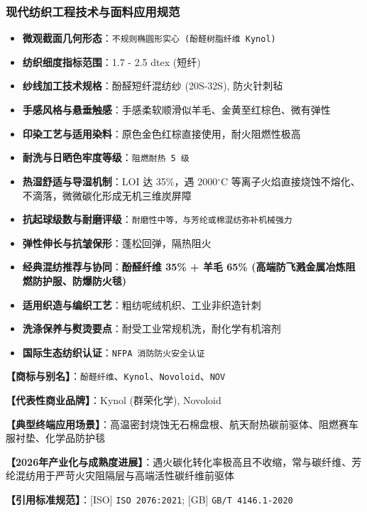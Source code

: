 \documentclass[11pt,openright,twoside,UTF8]{ctexbook}
\begin{document}
\subsubsection*{现代纺织工程技术与面料应用规范}
\begin{itemize} \setlength{\itemsep}{2pt}
    \item \textbf{微观截面几何形态}：\texttt{不规则椭圆形实心 (酚醛树脂纤维 Kynol)}
    \item \textbf{纺织细度指标范围}：1.7 - 2.5 dtex (短纤)
    \item \textbf{纱线加工技术规格}：酚醛短纤混纺纱 (20S-32S), 防火针刺毡
    \item \textbf{手感风格与悬垂触感}：手感柔软顺滑似羊毛、金黄至红棕色、微有弹性
    \item \textbf{印染工艺与适用染料}：原色金色红棕直接使用，耐火阻燃性极高
    \item \textbf{耐洗与日晒色牢度等级}：\texttt{阻燃耐热 5 级}
    \item \textbf{热湿舒适与导湿机制}：LOI 达 35\%，遇 2000$^\circ\mathrm{C}$ 等离子火焰直接烧蚀不熔化、不滴落，微微碳化形成无机三维炭屏障
    \item \textbf{抗起球级数与耐磨评级}：\texttt{耐磨性中等，与芳纶或棉混纺弥补机械强力}
    \item \textbf{弹性伸长与抗皱保形}：蓬松回弹，隔热阻火
    \item \textbf{经典混纺推荐与协同}：\textbf{酚醛纤维 35\% + 羊毛 65\% (高端防飞溅金属冶炼阻燃防护服、防爆防火毯)}
    \item \textbf{适用织造与编织工艺}：粗纺呢绒机织、工业非织造针刺
    \item \textbf{洗涤保养与熨烫要点}：耐受工业常规机洗，耐化学有机溶剂
    \item \textbf{国际生态纺织认证}：\texttt{NFPA 消防防火安全认证}
\end{itemize}
\vspace{0.2cm}

\noindent\textbf{【商标与别名】}：\texttt{酚醛纤维}、\texttt{Kynol}、\texttt{Novoloid}、\texttt{NOV}\par
\noindent\textbf{【代表性商业品牌】}：Kynol (群荣化学), Novoloid\par
\noindent\textbf{【典型终端应用场景】}：高温密封烧蚀无石棉盘根、航天耐热碳前驱体、阻燃赛车服衬垫、化学品防护毯\par
\noindent\textbf{【2026年产业化与成熟度进展】}：遇火碳化转化率极高且不收缩，常与碳纤维、芳纶混纺用于严苛火灾阻隔层与高端活性碳纤维前驱体\par
\noindent\textbf{【引用标准规范】}：[ISO] \texttt{ISO 2076:2021}; [GB] \texttt{GB/T 4146.1-2020}\par
\vspace{0.5cm}
\end{document}
